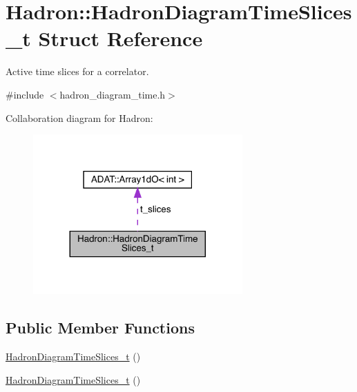 \hypertarget{structHadron_1_1HadronDiagramTimeSlices__t}{}\section{Hadron\+:\+:Hadron\+Diagram\+Time\+Slices\+\_\+t Struct Reference}
\label{structHadron_1_1HadronDiagramTimeSlices__t}


Active time slices for a correlator.  




{\ttfamily \#include $<$hadron\+\_\+diagram\+\_\+time.\+h$>$}



Collaboration diagram for Hadron\+:\nopagebreak
\begin{figure}[H]
\begin{center}
\leavevmode
\includegraphics[width=227pt]{da/db5/structHadron_1_1HadronDiagramTimeSlices__t__coll__graph}
\end{center}
\end{figure}
\subsection*{Public Member Functions}
\begin{DoxyCompactItemize}
\item 
\mbox{\hyperlink{structHadron_1_1HadronDiagramTimeSlices__t_a2c90aaaf0112e21e3c3f065ac2d32682}{Hadron\+Diagram\+Time\+Slices\+\_\+t}} ()
\item 
\mbox{\hyperlink{structHadron_1_1HadronDiagramTimeSlices__t_a2c90aaaf0112e21e3c3f065ac2d32682}{Hadron\+Diagram\+Time\+Slices\+\_\+t}} ()
\end{DoxyCompactItemize}
